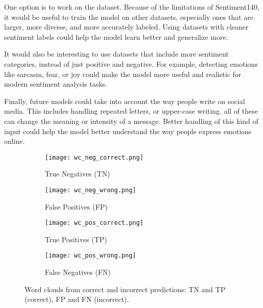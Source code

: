 \documentclass[twocolumn,superscriptaddress,aps]{revtex4-1}
\begin{document}
One option is to work on the dataset. Because of the limitations of Sentiment140, it would be useful to train the model on other datasets, especially ones that are larger, more diverse, and more accurately labeled. Using datasets with cleaner sentiment labels could help the model learn better and generalize more.

It would also be interesting to use datasets that include more sentiment categories, instead of just positive and negative. For example, detecting emotions like sarcasm, fear, or joy could make the model more useful and realistic for modern sentiment analysis tasks.

Finally, future models could take into account the way people write on social media. This includes handling repeated letters, or upper-case writing. all of these can change the meaning or intensity of a message. Better handling of this kind of input could help the model better understand the way people express emotions online.

\begin{figure*}[t]
    \centering
    \begin{subfigure}{0.3\textwidth}
        \texttt{[image: wc\_neg\_correct.png]}
        \caption{True Negatives (TN)}
    \end{subfigure}
    \begin{subfigure}{0.3\textwidth}
        \texttt{[image: wc\_neg\_wrong.png]}
        \caption{False Positives (FP)}
    \end{subfigure}
    
    \begin{subfigure}{0.3\textwidth}
        \texttt{[image: wc\_pos\_correct.png]}
        \caption{True Positives (TP)}
    \end{subfigure}
    \begin{subfigure}{0.3\textwidth}
        \texttt{[image: wc\_pos\_wrong.png]}
        \caption{False Negatives (FN)}
    \end{subfigure}
    
    \caption{Word clouds from correct and incorrect predictions: TN and TP (correct), FP and FN (incorrect).}
    \label{fig:wordclouds}
\end{figure*}



\end{document}
